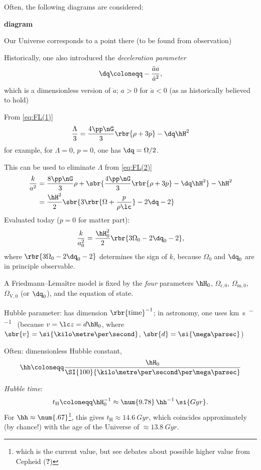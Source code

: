 Often, the following diagrams are considered:

\textbf{diagram}

Our Universe corresponds to a point there (to be found from observation)

Historically, one also introduced the \emph{deceleration parameter}
\begin{equation}
 \dq \coloneqq -\frac{\ddot{a}a}{\dot{a}^2},
\end{equation}
which is a dimensionless version of $\ddot{a}$; $a > 0$ for $\ddot{a} < 0$ (as 
as historically believed to hold)

From \cref{eq:FL(1)}
\begin{equation}
\frac{\Lambda}{3} = \frac{4\pp\nG}{3}\rbr{\rho+3p} - \dq\hH^2
\label{eq:p446}
\end{equation}
for example, for $\Lambda = 0$, $p = 0$, one has $\dq = \Omega/2$.

This can be used to eliminate $\Lambda$ from \cref{eq:FL(2)}
\begin{align}
\frac{k}{a^2} &= \frac{8\pp\nG}{3}\rho + \sbr{\frac{4\pp\nG}{3}\rbr{\rho+3p} - 
\dq\hH^2} - \hH^2 \nonumber \\
&= \frac{\hH^2}{2}\sbr{3\rbr{\Omega+\frac{p}{\rho\lc}} - 2\dq - 2}
\end{align}
Evaluated today ($p = 0$ for matter part):
\begin{equation}
\frac{k}{a_0^2} = \frac{\hH_0^2}{2}\rbr{3\Omega_0 - 2\dq_0 - 2},
\end{equation}
where $\rbr{3\Omega_0 - 2\dq_0 - 2}$ determines the sign of $k$, because 
$\Omega_0$ and $\dq_0$ are in principle observable.

A Friedmann--Lemaître model is fixed by the \emph{four} parameters $\hH_0$, 
$\Omega_{\text{r},0}$, $\Omega_{\text{m},0}$, $\Omega_{\text{V},0}$ (or 
$\dq_0$), 
and the equation of state. 

Hubble parameter: has dimension $\rbr{\text{time}}^{-1}$; in astronomy, one 
uses \si{\kilo\metre\per\second\per\mega\parsec} (because $v = \lc z = d 
\hH_0$, 
where $\sbr{v} = \si{\kilo\metre\per\second}$, $\sbr{d} = \si{\mega\parsec}$)

Often: dimensionless Hubble constant,
\begin{equation}
 \hh \coloneqq \frac{\hH_0}{\SI{100}{\kilo\metre\per\second\per\mega\parsec}}
\end{equation}

\emph{Hubble time}:
\begin{equation}
 t_\text{H} \coloneqq \hH_0^{-1} \approx \num{9.78}\,\hh^{-1}\,\si{Gyr}.
\end{equation}
For $\hh\approx \num{.67}$\footnote{which is the current value, but see debates 
about possible higher value from Cepheid (\textbf{?})}, this gives $t_\text{H} 
\approx \SI{14.6}{Gyr}$, which coincides approximately (by chance!) with the 
age of the Universe of $\approx \SI{13.8}{Gyr}$.

